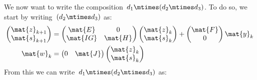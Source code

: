 We now want to write the composition~$d_1\mtimes (d_2\mtimes d_3)$.
To do so, we start by writing~$(d_2\mtimes d_3)$ as:
\begin{equation*}
    \label{eq:dlin-6}
    \begin{aligned}
        \begin{pmatrix}
            \mat{z}_{k+1}\\
            \mat{s}_{k+1}
        \end{pmatrix}&=
        \begin{pmatrix}
            \mat{E}&0\\
            \mat{IG}&\mat{H}
        \end{pmatrix}\begin{pmatrix}
                         \mat{z}_k\\ \mat{s}_k
        \end{pmatrix}+
        \begin{pmatrix}
            \mat{F}\\ 0
        \end{pmatrix}\mat{y}_k\\
        \mat{w}_k&=\begin{pmatrix}
                       0&\mat{J}
        \end{pmatrix}\begin{pmatrix}
                         \mat{z}_k\\ \mat{s}_k
        \end{pmatrix}
    \end{aligned}
\end{equation*}
From this we can write~$d_1\mtimes (d_2\mtimes d_3)$ as:
